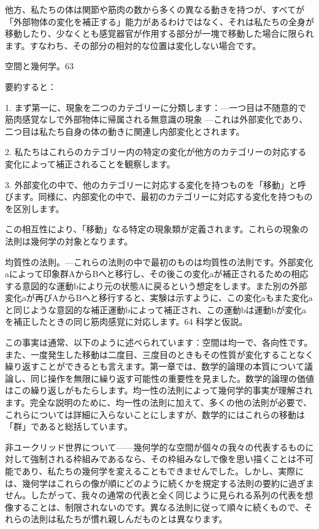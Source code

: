 \documentclass[a4paper,11pt,openany]{ltjsbook}
\begin{document}
他方、私たちの体は関節や筋肉の数から多くの異なる動きを持つが、すべてが「外部物体の変化を補正する」能力があるわけではなく、それは私たちの全身が移動したり、少なくとも感覚器官が作用する部分が一塊で移動した場合に限られます。すなわち、その部分の相対的な位置は変化しない場合です。

空間と幾何学。63

要約すると：

1. まず第一に、現象を二つのカテゴリーに分類します：—一つ目は不随意的で筋肉感覚なしで外部物体に帰属される無意識の現象 —これは外部変化であり、二つ目は私たち自身の体の動きに関連し内部変化とされます。

2. 私たちはこれらのカテゴリー内の特定の変化が他方のカテゴリーの対応する変化によって補正されることを観察します。

3. 外部変化の中で、他のカテゴリーに対応する変化を持つものを「移動」と呼びます。同様に、内部変化の中で、最初のカテゴリーに対応する変化を持つものを区別します。

この相互性により、「移動」なる特定の現象類が定義されます。これらの現象の法則は幾何学の対象となります。

均質性の法則。—これらの法則の中で最初のものは均質性の法則です。外部変化aによって印象群AからBへと移行し、その後この変化aが補正されるための相応する意図的な運動bにより元の状態Aに戻るという想定をします。また別の外部変化aが再びAからBへと移行すると、実験は示すように、この変化aもまた変化aと同じような意図的な補正運動bによって補正され、この運動bは運動bが変化aを補正したときの同じ筋肉感覚に対応します。64 科学と仮説。


この事実は通常、以下のように述べられています：空間は均一で、各向性です。また、一度発生した移動は二度目、三度目のときもその性質が変化することなく繰り返すことができるとも言えます。第一章では、数学的論理の本質について議論し、同じ操作を無限に繰り返す可能性の重要性を見ました。数学的論理の価値はこの繰り返しがもたらします。均一性の法則によって幾何学的事実が理解されます。完全な説明のために、均一性の法則に加えて、多くの他の法則が必要で、これらについては詳細に入らないことにしますが、数学的にはこれらの移動は「群」であると総括しています。

非ユークリッド世界について——幾何学的な空間が個々の我々の代表するものに対して強制される枠組みであるなら、その枠組みなしで像を思い描くことは不可能であり、私たちの幾何学を変えることもできませんでした。しかし、実際には、幾何学はこれらの像が順にどのように続くかを規定する法則の要約に過ぎません。したがって、我々の通常の代表と全く同じように見られる系列の代表を想像することは、制限されないのです。異なる法則に従って順々に続くもので、それらの法則は私たちが慣れ親しんだものとは異なります。
\end{document}
